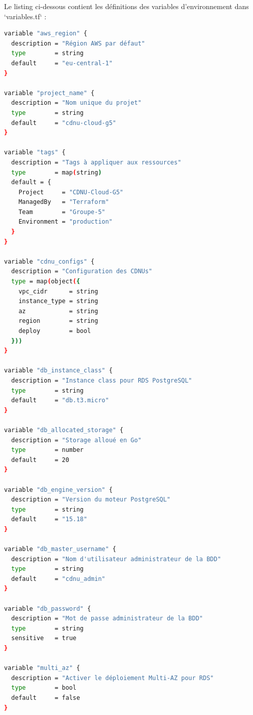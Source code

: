 \documentclass[12pt,a4paper]{article}
\begin{document}
Le listing ci-dessous contient les définitions des variables d'environnement dans `variables.tf` :
\begin{lstlisting}[language=bash,caption={Fichier de déclaration des variables globales (variables.tf)}]
variable "aws_region" {
  description = "Région AWS par défaut"
  type        = string
  default     = "eu-central-1"
}

variable "project_name" {
  description = "Nom unique du projet"
  type        = string
  default     = "cdnu-cloud-g5"
}

variable "tags" {
  description = "Tags à appliquer aux ressources"
  type        = map(string)
  default = {
    Project     = "CDNU-Cloud-G5"
    ManagedBy   = "Terraform"
    Team        = "Groupe-5"
    Environment = "production"
  }
}

variable "cdnu_configs" {
  description = "Configuration des CDNUs"
  type = map(object({
    vpc_cidr      = string
    instance_type = string
    az            = string
    region        = string
    deploy        = bool
  }))
}

variable "db_instance_class" {
  description = "Instance class pour RDS PostgreSQL"
  type        = string
  default     = "db.t3.micro"
}

variable "db_allocated_storage" {
  description = "Storage alloué en Go"
  type        = number
  default     = 20
}

variable "db_engine_version" {
  description = "Version du moteur PostgreSQL"
  type        = string
  default     = "15.18"
}

variable "db_master_username" {
  description = "Nom d'utilisateur administrateur de la BDD"
  type        = string
  default     = "cdnu_admin"
}

variable "db_password" {
  description = "Mot de passe administrateur de la BDD"
  type        = string
  sensitive   = true
}

variable "multi_az" {
  description = "Activer le déploiement Multi-AZ pour RDS"
  type        = bool
  default     = false
}
\end{lstlisting}
\end{document}
